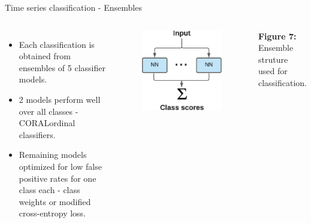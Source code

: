 \begin{frame}[fragile]{Time series classification - Ensembles}
\begin{columns}[onlytextwidth]
\begin{itemize}
  \item Each classification is obtained from ensembles of 5 classifier models.
  \item 2 models perform well over all classes - CORAL\footnotemark ordinal classifiers.
  \item Remaining models optimized for low false positive rates for one class each - class weights or modified cross-entropy loss.
\end{itemize}

\begin{figure}
  \centering
  \includegraphics[width=\textwidth]{files/figs/presentation/ensemble.eps}
\end{figure}
{\scriptsize\newline\textbf{Figure 7:} Ensemble struture used for classification.}
\end{columns}

  \end{frame}


